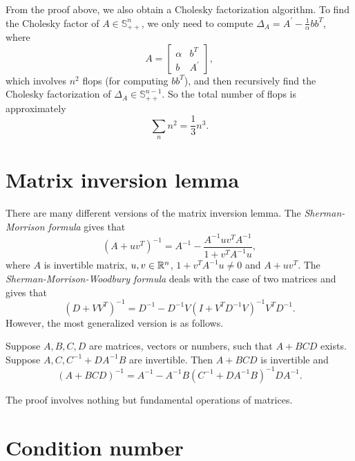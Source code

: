 \documentclass[12pt]{article}
\begin{document}
\begin{remark}
    From the proof above, we also obtain a Cholesky factorization algorithm. To find the Cholesky factor of \(A\in\mathbb S_{++}^n\), we only need to compute \(\Delta_A=A^\prime-\frac1\alpha bb^T\), where
    \[A=\begin{bmatrix}
        \alpha & b^T \\ b & A^\prime
    \end{bmatrix},\]
    which involves \(n^2\) flops (for computing \(bb^T\)), and then recursively find the Cholesky factorization of \(\Delta_A\in\mathbb S_{++}^{n-1}\). So the total number of flops is approximately
    \[\sum_n n^2=\frac13n^3.\]
\end{remark}

\section{Matrix inversion lemma}

There are many different versions of the matrix inversion lemma. The \textit{Sherman-Morrison formula} gives that
\[\left(A+uv^T\right)^{-1}=A^{-1}-\frac{A^{-1}uv^TA^{-1}}{1+v^TA^{-1}u},\]
where \(A\) is invertible matrix, \(u,v\in\mathbb R^n\), \(1+v^TA^{-1}u\neq 0\) and \(A+uv^T\). The \textit{Sherman-Morrison-Woodbury formula} deals with the case of two matrices and gives that
\[\left(D+VV^T\right)^{-1}=D^{-1}-D^{-1}V\left(I+V^TD^{-1}V\right)^{-1}V^TD^{-1}.\]
However, the most generalized version is as follows.

\begin{theorem}
    Suppose \(A,B,C,D\) are matrices, vectors or numbers, such that \(A+BCD\) exists. Suppose \(A,C,C^{-1}+DA^{-1}B\) are invertible. Then \(A+BCD\) is invertible and
    \[\left(A+BCD\right)^{-1}=A^{-1}-A^{-1}B\left(C^{-1}+DA^{-1}B\right)^{-1}DA^{-1}.\]
\end{theorem}

The proof involves nothing but fundamental operations of matrices.

\section{Condition number}
\end{document}
